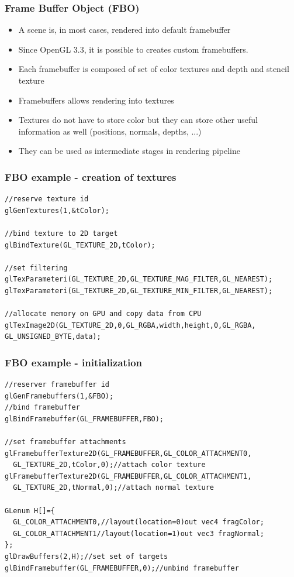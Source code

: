 \begin{frame}[fragile]
\frametitle{Frame Buffer Object (FBO)}
  \begin{itemize}
    \item A scene is, in most cases, rendered into default framebuffer
    \item Since OpenGL 3.3, it is possible to creates custom framebuffers.
    \item Each framebuffer is composed of set of color textures and depth and stencil texture
    \item Framebuffers allows rendering into textures
    \item Textures do not have to store color but they can store other useful information as well (positions, normals, depths, ...)
    \item They can be used as intermediate stages in rendering pipeline
  \end{itemize}
\end{frame}

\begin{frame}[fragile]
\frametitle{FBO example - creation of textures}
  {\scriptsize
  \begin{verbatim}
//reserve texture id
glGenTextures(1,&tColor);

//bind texture to 2D target
glBindTexture(GL_TEXTURE_2D,tColor);

//set filtering
glTexParameteri(GL_TEXTURE_2D,GL_TEXTURE_MAG_FILTER,GL_NEAREST);
glTexParameteri(GL_TEXTURE_2D,GL_TEXTURE_MIN_FILTER,GL_NEAREST);

//allocate memory on GPU and copy data from CPU
glTexImage2D(GL_TEXTURE_2D,0,GL_RGBA,width,height,0,GL_RGBA,
GL_UNSIGNED_BYTE,data);
  \end{verbatim}
  }
\end{frame}

\begin{frame}[fragile]
\frametitle{FBO example - initialization}
  {\scriptsize
  \begin{verbatim}
//reserver framebuffer id
glGenFramebuffers(1,&FBO);
//bind framebuffer
glBindFramebuffer(GL_FRAMEBUFFER,FBO);

//set framebuffer attachments
glFramebufferTexture2D(GL_FRAMEBUFFER,GL_COLOR_ATTACHMENT0,
  GL_TEXTURE_2D,tColor,0);//attach color texture
glFramebufferTexture2D(GL_FRAMEBUFFER,GL_COLOR_ATTACHMENT1,
  GL_TEXTURE_2D,tNormal,0);//attach normal texture

GLenum H[]={
  GL_COLOR_ATTACHMENT0,//layout(location=0)out vec4 fragColor;
  GL_COLOR_ATTACHMENT1//layout(location=1)out vec3 fragNormal;
};
glDrawBuffers(2,H);//set set of targets
glBindFramebuffer(GL_FRAMEBUFFER,0);//unbind framebuffer
  \end{verbatim}
  }
\end{frame}

